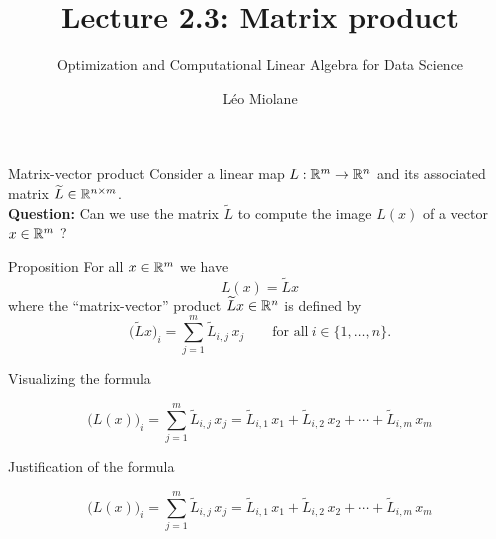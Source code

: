 \documentclass{beamer}
\title{Lecture 2.3: Matrix product}
\subtitle{Optimization and Computational Linear Algebra for Data Science}
\author{Léo Miolane}
\date{}
\begin{document}
\setcounter{showProgressBar}{0}
\setcounter{showSlideNumbers}{0}

\frame{\titlepage}


\setcounter{framenumber}{0}
\setcounter{showSlideNumbers}{1}

\begin{frame}[t]{Matrix-vector product}
	Consider a linear map $L:\mathbb{R}^m \to \mathbb{R}^n$ and its associated matrix $\widetilde{L} \in \mathbb{R}^{n \times m}$.
	\\
	\vspace{0.3cm}
	\textbf{Question:} Can we use the matrix $\widetilde{L}$ to compute the image $L(x)$ of a vector $x\in\mathbb{R}^m$ ?
	\vspace{0.3cm}

	\begin{block}{Proposition}
		For all $x\in\mathbb{R}^m$ we have
		$$
		L(x) = \widetilde{L} x
		$$
		where the ``matrix-vector'' product $\widetilde{L}x \in \mathbb{R}^n$ is defined by
		$$
		\big(\widetilde{L}x\big)_i = \sum_{j=1}^m \widetilde{L}_{i,j} \, x_j \qquad \text{for all} \ i \in \{1, \dots, n\}.
		$$
		\vspace{-0.5cm}
	\end{block}
\end{frame}
\begin{frame}[t]{Visualizing the formula}
	\vspace{-0.9cm}
	\begin{exampleblock}{}
		\vspace{-0.4cm}
		$$
		\big(L(x)\big)_i = \sum_{j=1}^m \widetilde{L}_{i,j} \, x_j
		= \widetilde{L}_{i,1} \, x_1 + \widetilde{L}_{i,2} \, x_2 + \cdots + \widetilde{L}_{i,m} \, x_m
		$$
		\vspace{-0.4cm}
	\end{exampleblock}
\end{frame}
\begin{frame}[t]{Justification of the formula}
	\vspace{-0.9cm}
	\begin{exampleblock}{}
		\vspace{-0.4cm}
		$$
		\big(L(x)\big)_i = \sum_{j=1}^m \widetilde{L}_{i,j} \, x_j
		= \widetilde{L}_{i,1} \, x_1 + \widetilde{L}_{i,2} \, x_2 + \cdots + \widetilde{L}_{i,m} \, x_m
		$$
		\vspace{-0.4cm}
	\end{exampleblock}
\end{frame}
\end{document}
